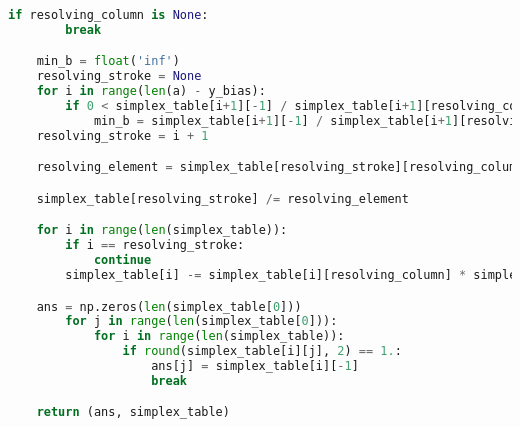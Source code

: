 \documentclass[a4paper, 14pt]{extarticle}
\begin{document}
\begin{lstlisting}[language=python]
	if resolving_column is None:
		break

	min_b = float('inf')
	resolving_stroke = None
	for i in range(len(a) - y_bias):
		if 0 < simplex_table[i+1][-1] / simplex_table[i+1][resolving_column] < min_b:
			min_b = simplex_table[i+1][-1] / simplex_table[i+1][resolving_column]
	resolving_stroke = i + 1

	resolving_element = simplex_table[resolving_stroke][resolving_column]

	simplex_table[resolving_stroke] /= resolving_element

	for i in range(len(simplex_table)):
		if i == resolving_stroke:
			continue
		simplex_table[i] -= simplex_table[i][resolving_column] * simplex_table[resolving_stroke]

	ans = np.zeros(len(simplex_table[0]))
		for j in range(len(simplex_table[0])):
			for i in range(len(simplex_table)):
				if round(simplex_table[i][j], 2) == 1.:
					ans[j] = simplex_table[i][-1]
					break

	return (ans, simplex_table)
 	\end{lstlisting}
		  
\end{document}

